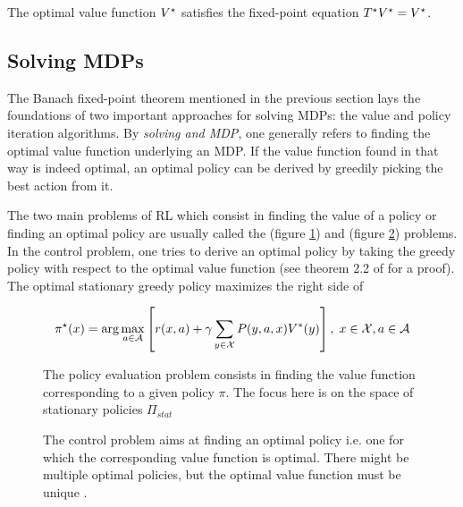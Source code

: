 The optimal value function $V^\star$ satisfies the fixed-point equation
$T^\star V^\star = V^\star$.

\subsection{Solving MDPs}

The Banach fixed-point theorem mentioned in the previous section lays the foundations of
two important approaches for solving MDPs: the value and policy iteration algorithms. By
\textit{solving and MDP}, one generally refers to finding the optimal value function
underlying an MDP. If the value function found in that way is indeed optimal, an
optimal policy can be derived by greedily picking the best action from it.

The two main problems of RL which consist in finding the value of a policy or finding an optimal policy are usually called the  (figure \ref{fig:prediction-problem}) and  (figure \ref{fig:control-problem}) problems. In the control
problem, one tries to derive an optimal policy by taking the greedy policy with
respect to the optimal value function (see theorem 2.2 of \cite{Ross1983} for a proof). The optimal stationary greedy policy maximizes the right side of

\begin{equation}
\pi^\star(x) = \arg \max_{a \in \mathcal{A}} \left[ r(x,a) + \gamma \sum_{y \in
\mathcal{X}} P(y, a, x) V^*(y)\right], \; x \in
\mathcal{X}, a \in \mathcal{A} \label{eq:greedy-optimal-policy}
\end{equation}

\begin{figure}
\centering

\caption{The policy evaluation problem consists in finding the value function
corresponding to a given policy $\pi$. The focus here is on the space of 
stationary policies $\Pi_{stat}$}
\label{fig:prediction-problem}
\end{figure}

\begin{figure}
\centering

\caption{The control problem aims at finding an optimal policy i.e. one for which the
corresponding value function is optimal. There might be multiple optimal policies, but
the optimal value function must be unique \parencite{Ross1983}.}
\label{fig:control-problem}
\end{figure}

